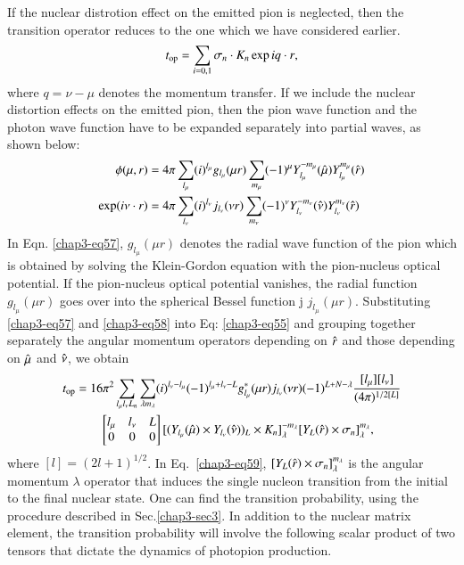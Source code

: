 If the nuclear distrotion effect on the emitted pion is neglected, then the transition operator reduces to the one which we have considered earlier.
\begin{equation}
t_{\text{op}} = \sum_{i=0, 1} \sigma_n \cdot {\boldmath K}_n \exp i {\boldmath q \cdot r}, \label{chap3-eq56}
\end{equation}
where $q= \nu -\mu$ denotes the momentum transfer. If we include the nuclear distortion effects on the emitted pion, then the pion wave function and the photon wave function have to be expanded separately into partial waves, as shown below:
\begin{align}
  \phi (\mu , {\boldmath r}) & = 4 \pi \sum_{l_{\mu}} (i)^{l_\mu} g_{l_\mu}(\mu r)\sum_{m_\mu} (-1)^\mu Y_{l_\mu}^{-m _\mu} ({\boldmath \hat{\mu}}) Y_{l_\mu}^{m_\mu} ({\boldmath \hat{r}}) \label{chap3-eq57}\\
  \exp (i \nu \cdot {\boldmath r}) & = 4 \pi \sum_{l_\nu} (i)^{l_\nu} j_{l_\nu} (\nu r) \sum_{m_\nu} (-1)^\nu Y_{l_\nu}^{-m_\nu} ({\boldmath \hat{\nu}}) Y_{l_\nu}^{m_\nu} ({\boldmath \hat{r}}) \label{chap3-eq58}
\end{align}
In Eqn. \eqref{chap3-eq57}, $g_{l_\mu} (\mu r)$ denotes the radial wave function of the pion which is obtained by solving the Klein-Gordon equation with the pion-nucleus optical potential. If the pion-nucleus optical potential vanishes, the radial function $g_{l_\mu}(\mu r)$ goes over into the spherical Bessel function j $j_{l_\mu}(\mu r)$. Substituting \eqref{chap3-eq57} and \eqref{chap3-eq58} into Eq: \eqref{chap3-eq55} and grouping together separately the angular momentum operators depending on ${\boldmath \hat{r}}$ and those depending on ${\boldmath \hat{\mu}}$ and ${\boldmath \hat{\nu}}$, we obtain
\begin{align}
  t_{\text{op}} & = 16\pi^2 \sum_{l_\mu l_\nu L_n} \sum_{\lambda m_\lambda} (i)^{l_\nu - l_\mu} (-1)^{l_\mu + l_\nu - L} g_{l_\mu}^\ast (\mu r)j_{l_\nu} (\nu r) (-1)^{L+N-\lambda} \frac{[l_\mu][l_\nu]}{(4 \pi)^{1/2 [L]}}\notag\\
  & \qquad \begin{bmatrix} l_\mu & l_\nu & L\\ 0 & 0 & 0   \end{bmatrix} [(Y_{l_\mu}(\hat{\mu}) \times Y_{l_\nu} (\hat{\nu}))_L \times {\boldmath K}_n]_\lambda^{-m_\lambda} [Y_L ({\boldmath \hat{r}}) \times \sigma_n]_{\lambda}^{m_\lambda}, \label{chap3-eq59}
\end{align}
where $[l] = (2l+1)^{1/2}$. In Eq.\ \eqref{chap3-eq59}, $[Y_L ({\boldmath \hat{r}}) \times \sigma_n]_\lambda^{m_\lambda}$ is the angular momentum $\lambda$ operator that induces the single nucleon transition from the initial to the final nuclear state. One can find the transition probability, using the procedure described in Sec.\ref{chap3-sec3}. In addition to the nuclear matrix element, the transition probability will involve the following scalar product of two tensors that dictate the dynamics of photopion production.
